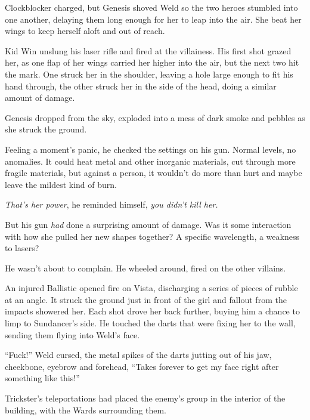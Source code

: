 Clockblocker charged, but Genesis shoved Weld so the two heroes stumbled into one another, delaying them long enough for her to leap into the air.  She beat her wings to keep herself aloft and out of reach.



Kid Win unslung his laser rifle and fired at the villainess.  His first shot grazed her, as one flap of her wings carried her higher into the air, but the next two hit the mark.  One struck her in the shoulder, leaving a hole large enough to fit his hand through, the other struck her in the side of the head, doing a similar amount of damage.



Genesis dropped from the sky, exploded into a mess of dark smoke and pebbles as she struck the ground.



Feeling a moment's panic, he checked the settings on his gun.  Normal levels, no anomalies.  It could heat metal and other inorganic materials, cut through more fragile materials, but against a person, it wouldn't do more than hurt and maybe leave the mildest kind of burn.



\emph{That's her power}, he reminded himself, \emph{you didn't kill her.}



But his gun\emph{ had} done a surprising amount of damage.  Was it some interaction with how she pulled her new shapes together?  A specific wavelength, a weakness to lasers?



He wasn't about to complain.  He wheeled around, fired on the other villains.



An injured Ballistic opened fire on Vista, discharging a series of pieces of rubble at an angle.  It struck the ground just in front of the girl and fallout from the impacts showered her.  Each shot drove her back further, buying him a chance to limp to Sundancer's side.  He touched the darts that were fixing her to the wall, sending them flying into Weld's face.



``Fuck!'' Weld cursed, the metal spikes of the darts jutting out of his jaw, cheekbone, eyebrow and forehead, ``Takes forever to get my face right after something like this!''



Trickster's teleportations had placed the enemy's group in the interior of the building, with the Wards surrounding them.



